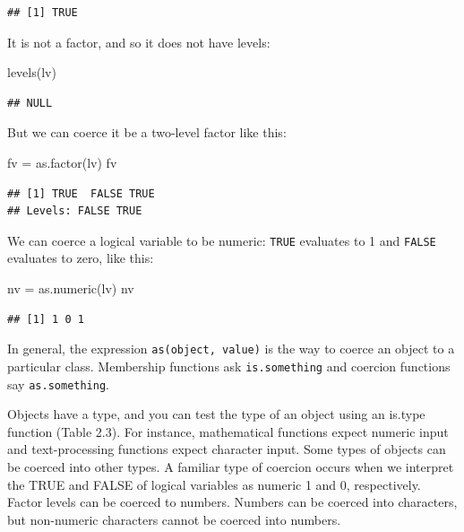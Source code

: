 \documentclass[
]{book}
\newenvironment{Shaded}{\begin{snugshade}}{\end{snugshade}}
\newcommand{\FunctionTok}[1]{\textcolor[rgb]{0.00,0.00,0.00}{#1}}
\newcommand{\NormalTok}[1]{#1}
\newcommand{\OtherTok}[1]{\textcolor[rgb]{0.56,0.35,0.01}{#1}}
\theoremstyle{definition}
\theoremstyle{definition}
\theoremstyle{definition}
\theoremstyle{definition}
\theoremstyle{remark}
\begin{document}
\begin{verbatim}
## [1] TRUE
\end{verbatim}

It is not a factor, and so it does not have levels:

\begin{Shaded}
\begin{Highlighting}[]
\FunctionTok{levels}\NormalTok{(lv)}
\end{Highlighting}
\end{Shaded}

\begin{verbatim}
## NULL
\end{verbatim}

But we can coerce it be a two-level factor like this:

\begin{Shaded}
\begin{Highlighting}[]
\NormalTok{fv }\OtherTok{=} \FunctionTok{as.factor}\NormalTok{(lv)}
\NormalTok{fv}
\end{Highlighting}
\end{Shaded}

\begin{verbatim}
## [1] TRUE  FALSE TRUE 
## Levels: FALSE TRUE
\end{verbatim}

We can coerce a logical variable to be numeric: \texttt{TRUE} evaluates to 1 and \texttt{FALSE} evaluates to zero, like this:

\begin{Shaded}
\begin{Highlighting}[]
\NormalTok{nv }\OtherTok{=} \FunctionTok{as.numeric}\NormalTok{(lv)}
\NormalTok{nv}
\end{Highlighting}
\end{Shaded}

\begin{verbatim}
## [1] 1 0 1
\end{verbatim}

In general, the expression \texttt{as(object,\ value)} is the way to coerce an object to a particular class. Membership functions ask \texttt{is.something} and coercion functions say \texttt{as.something}.

Objects have a type, and you can test the type of an object using an is.type function (Table 2.3). For instance, mathematical functions expect numeric input and text-processing functions expect character input. Some types of objects can be coerced into other types. A familiar type of coercion occurs when we interpret the TRUE and FALSE of logical variables as numeric 1 and 0, respectively. Factor levels can be coerced to numbers. Numbers can be coerced into characters, but non-numeric characters cannot be coerced into numbers.
\end{document}
